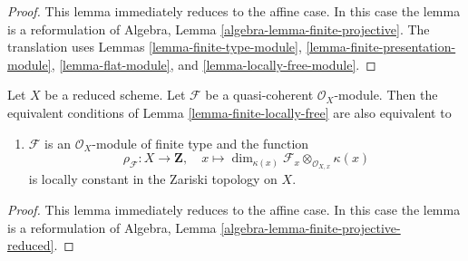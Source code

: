 \begin{proof}
This lemma immediately reduces to the affine case.
In this case the lemma is a reformulation of
Algebra, Lemma \ref{algebra-lemma-finite-projective}.
The translation uses
Lemmas \ref{lemma-finite-type-module},
\ref{lemma-finite-presentation-module},
\ref{lemma-flat-module}, and
\ref{lemma-locally-free-module}.
\end{proof}

\begin{lemma}
\label{lemma-finite-locally-free-reduced}
Let $X$ be a reduced scheme. Let $\mathcal{F}$ be a quasi-coherent
$\mathcal{O}_X$-module. Then the equivalent conditions of
Lemma \ref{lemma-finite-locally-free} are also equivalent to
\begin{enumerate}
\item[(6)] $\mathcal{F}$ is an $\mathcal{O}_X$-module of finite type and
the function
$$
\rho_\mathcal{F} : X \to \mathbf{Z}, \quad
x \longmapsto
\dim_{\kappa(x)} \mathcal{F}_x \otimes_{\mathcal{O}_{X, x}} \kappa(x)
$$
is locally constant in the Zariski topology on $X$.
\end{enumerate}
\end{lemma}

\begin{proof}
This lemma immediately reduces to the affine case.
In this case the lemma is a reformulation of
Algebra, Lemma \ref{algebra-lemma-finite-projective-reduced}.
\end{proof}




